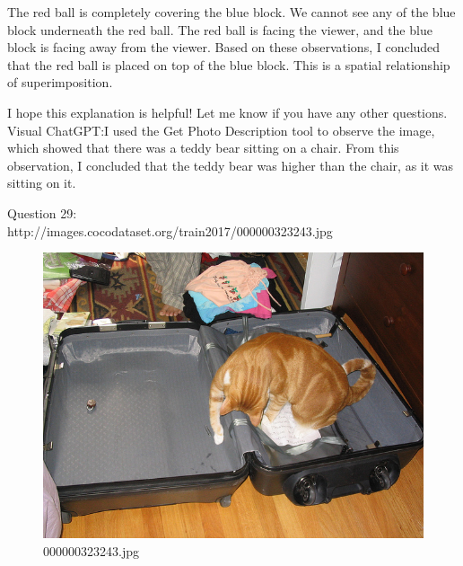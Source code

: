 \begin{enumerate}
        The red ball is completely covering the blue block.
        We cannot see any of the blue block underneath the red ball.
        The red ball is facing the viewer, and the blue block is facing away from the viewer.
        Based on these observations, I concluded that the red ball is placed on top of the blue block. This is a spatial relationship of superimposition.
        
        I hope this explanation is helpful! Let me know if you have any other questions.
        \subitem Visual ChatGPT:I used the Get Photo Description tool to observe the image, which showed that there was a teddy bear sitting on a chair. From this observation, I concluded that the teddy bear was higher than the chair, as it was sitting on it.
    \end{enumerate}
    Question 29:\\http://images.cocodataset.org/train2017/000000323243.jpg
    \begin{figure}[h]
        \centering
        \includegraphics[width=0.8\linewidth]{../image set/easy/000000323243.jpg}
        \caption{000000323243.jpg}
    \end{figure}
